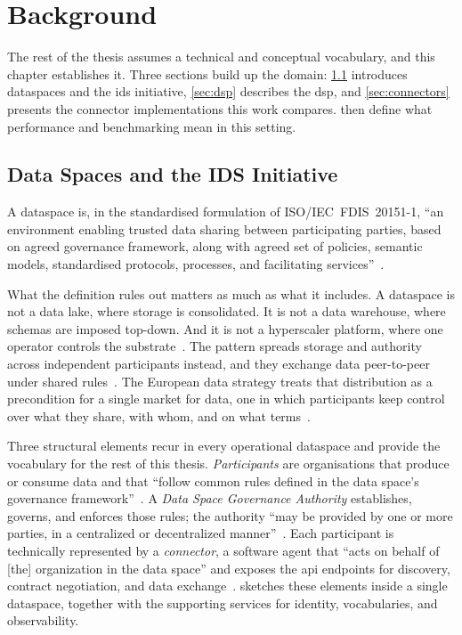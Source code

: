 \chapter{Background}\label{chap:background}

The rest of the thesis assumes a technical and conceptual vocabulary, and this chapter establishes it. Three sections build up the domain: \cref{sec:data-spaces-ids} introduces dataspaces and the \gls{ids} initiative, \cref{sec:dsp} describes the \gls{dsp}, and \cref{sec:connectors} presents the connector implementations this work compares.  then define what performance and benchmarking mean in this setting.

\section{Data Spaces and the IDS Initiative}\label{sec:data-spaces-ids}

A dataspace is, in the standardised formulation of ISO/IEC~FDIS~20151-1, ``an environment enabling trusted data sharing between participating parties, based on agreed governance framework, along with agreed set of policies, semantic models, standardised protocols, processes, and facilitating services''~\citep{isoiec20151, idsaknowledgebase}.

What the definition rules out matters as much as what it includes. A dataspace is not a data lake, where storage is consolidated. It is not a data warehouse, where schemas are imposed top-down. And it is not a hyperscaler platform, where one operator controls the substrate~\citep{designingdataspace}. The pattern spreads storage and authority across independent participants instead, and they exchange data peer-to-peer under shared rules~\citep{idsaknowledgebase, IDS4.0}. The European data strategy treats that distribution as a precondition for a single market for data, one in which participants keep control over what they share, with whom, and on what terms~\citep{europeancommission2020}.

Three structural elements recur in every operational dataspace and provide the vocabulary for the rest of this thesis. \emph{Participants} are organisations that produce or consume data and that ``follow common rules defined in the data space's governance framework''~\citep{idsaknowledgebase}. A \emph{Data Space Governance Authority} establishes, governs, and enforces those rules; the authority ``may be provided by one or more parties, in a centralized or decentralized manner''~\citep{idsaknowledgebase}. Each participant is technically represented by a \emph{connector}, a software agent that ``acts on behalf of [the] organization in the data space'' and exposes the \gls{api} endpoints for discovery, contract negotiation, and data exchange~\citep{idsaknowledgebase}.  sketches these elements inside a single dataspace, together with the supporting services for identity, vocabularies, and observability.

